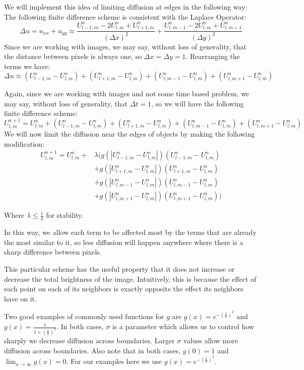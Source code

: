 We will implement this idea of limiting diffusion at edges in the following way:
The following finite difference scheme is consistent with the Laplace Operator:
\[\Delta u = u_{xx}+u_{yy} \approx \frac{U_{l-1,m}^n - 2 U_{l,m}^n + U_{l+1,m}^n}{(\Delta x)^2} + \frac{U_{l,m-1}^n-2 U_{l,m}^n + U_{l,m+1}^n}{(\Delta y)^2}\]
Since we are working with images, we may say, without loss of generality, that the distance between pixels is always one, so $\Delta x = \Delta y = 1$. Rearranging the terms we have:
\[\Delta u \approx (U_{l-1,m}^n - U_{l,m}^n) + (U_{l+1,m}^n - U_{l,m}^n) + (U_{l,m-1}^n - U_{l,m}^n) + (U_{l,m+1}^n - U_{l,m}^n)\]

Again, since we are working with images and not some time based problem, we may say, without loss of generality, that $\Delta t = 1$, so we will have the following finite difference scheme:
\[U_{l,m}^{n+1} = U_{l,m}^n + (U_{l-1,m}^n - U_{l,m}^n) + (U_{l+1,m}^n - U_{l,m}^n) + (U_{l,m-1}^n - U_{l,m}^n) + (U_{l,m+1}^n - U_{l,m}^n)\]
We will now limit the diffusion near the edges of objects by making the following modification:
\begin{align*}
U_{l,m}^{n+1} = U_{l,m}^n + & \lambda (g(|U_{l-1,m}^n - U_{l,m}^n|)(U_{l-1,m}^n - U_{l,m}^n) \\
			&+ g(|U_{l+1,m}^n - U_{l,m}^n|)(U_{l+1,m}^n - U_{l,m}^n) \\
			&+ g(|U_{l,m-1}^n - U_{l,m}^n|)(U_{l,m-1}^n - U_{l,m}^n) \\
			&+ g(|U_{l,m+1}^n - U_{l,m}^n|)(U_{l,m+1}^n - U_{l,m}^n))
\end{align*}

Where $\lambda \leq \frac{1}{4}$ for stability.

In this way, we allow each term to be affected most by the terms that are already the most similar to it, so less diffusion will happen anywhere where there is a sharp difference between pixels.

This particular scheme has the useful property that it does not increase or decrease the total brightness of the image.
Intuitively, this is because the effect of each point on each of its neighbors is exactly opposite the effect its neighbors have on it.

Two good examples of commonly used functions for $g$ are $g(x) = e^{-\left(\frac{x}{\sigma}\right)^2}$ and $g(x) = \frac{1}{1+\left(\frac{x}{\sigma}\right)^2}$.
In both cases, $\sigma$ is a parameter which allows us to control how sharply we decrease diffusion across boundaries.
Larger $\sigma$ values allow more diffusion across boundaries.
Also note that in both cases, $g(0) = 1$ and $\displaystyle{\lim_{x\to \infty} g(x) = 0}$.
For our examples here we use $g(x)=e^{-\left(\frac{x}{\sigma}\right)^2}$.

